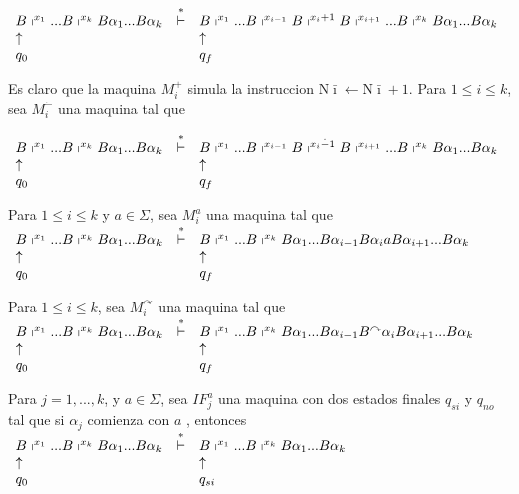   $\displaystyle \begin{array}{lcl} B\shortmid ^{x_{1}}...B\shortmid ^{x_{k}}B\alpha _{1}...B\alpha _{k} & \overset{\ast }{\vdash } & B\shortmid ^{x_{1}}...B\shortmid ^{x_{i-1}}B\shortmid ^{x_{i}+1}B\shortmid ^{x_{i+1}}...B\shortmid ^{x_{k}}B\alpha _{1}...B\alpha _{k} \\ \uparrow & & \uparrow \\ q_{0} & & q_{f} \end{array} $

  Es claro que la maquina $M_{i}^{+}$ simula la instruccion $\mathrm{N}\bar{ \imath}\leftarrow \mathrm{N}\bar{\imath}+1$.
  Para $1\leq i\leq k$, sea $M_{i}^{\dot{-}}$ una maquina tal que

  $\displaystyle \begin{array}{lcl} B\shortmid ^{x_{1}}...B\shortmid ^{x_{k}}B\alpha _{1}...B\alpha _{k} & \overset{\ast }{\vdash } & B\shortmid ^{x_{1}}...B\shortmid ^{x_{i-1}}B\shortmid ^{x_{i}\dot{-}1}B\shortmid ^{x_{i+1}}...B\shortmid ^{x_{k}}B\alpha _{1}...B\alpha _{k} \\ \uparrow & & \uparrow \\ q_{0} & & q_{f} \end{array} $

  Para $1\leq i\leq k$ y $a\in \Sigma $, sea $M_{i}^{a}$ una maquina tal que
  $\displaystyle \begin{array}{lcl} B\shortmid ^{x_{1}}...B\shortmid ^{x_{k}}B\alpha _{1}...B\alpha _{k} & \overset{\ast }{\vdash } & B\shortmid ^{x_{1}}...B\shortmid ^{x_{k}}B\alpha _{1}...B\alpha _{i-1}B\alpha _{i}aB\alpha _{i+1}...B\alpha _{k} \\ \uparrow & & \uparrow \\ q_{0} & & q_{f} \end{array} $

  Para $1\leq i\leq k$, sea $M_{i}^{\curvearrowright }$ una maquina tal que
  $\displaystyle \begin{array}{lcl} B\shortmid ^{x_{1}}...B\shortmid ^{x_{k}}B\alpha _{1}...B\alpha _{k} & \overset{\ast }{\vdash } & B\shortmid ^{x_{1}}...B\shortmid ^{x_{k}}B\alpha _{1}...B\alpha _{i-1}B^{\curvearrowright }\alpha _{i}B\alpha _{i+1}...B\alpha _{k} \\ \uparrow & & \uparrow \\ q_{0} & & q_{f} \end{array} $

  Para $j=1,...,k$, y $a\in \Sigma $, sea $IF_{j}^{a}$ una maquina con dos estados finales $q_{si}$ y $q_{no}$ tal que si $\alpha _{j}$ comienza con $a$ , entonces
  $\displaystyle \begin{array}{lcl} B\shortmid ^{x_{1}}...B\shortmid ^{x_{k}}B\alpha _{1}...B\alpha _{k} & \overset{\ast }{\vdash } & B\shortmid ^{x_{1}}...B\shortmid ^{x_{k}}B\alpha _{1}...B\alpha _{k} \\ \uparrow & & \uparrow \\ q_{0} & & q_{si} \end{array} $

